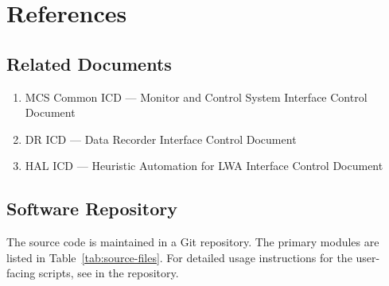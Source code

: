 
\chapter{References}
\label{sec:references}

\section{Related Documents}
\begin{enumerate}
    \item MCS Common ICD --- Monitor and Control System Interface Control Document
    \item DR ICD --- Data Recorder Interface Control Document
    \item HAL ICD --- Heuristic Automation for LWA Interface Control Document
\end{enumerate}

\section{Software Repository}

The \SC{} source code is maintained in a Git repository. The primary modules are listed in Table~\ref{tab:source-files}. For detailed usage instructions for the user-facing scripts, see  in the repository.

